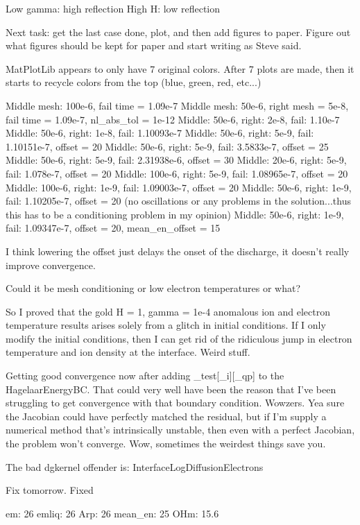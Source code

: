 {Low gamma: high reflection
High H: low reflection

Next task: get the last case done, plot, and then add figures to paper. Figure out what figures should be kept for paper and start writing as Steve said.

MatPlotLib appears to only have 7 original colors. After 7 plots are made, then it starts to recycle colors from the top (blue, green, red, etc...)

Middle mesh: 100e-6, fail time = 1.09e-7
Middle mesh: 50e-6, right mesh = 5e-8, fail time = 1.09e-7, nl_abs_tol = 1e-12
Middle: 50e-6, right: 2e-8, fail: 1.10e-7
Middle: 50e-6, right: 1e-8, fail: 1.10093e-7
Middle: 50e-6, right: 5e-9, fail: 1.10151e-7, offset = 20
Middle: 50e-6, right: 5e-9, fail: 3.5833e-7, offset = 25
Middle: 50e-6, right: 5e-9, fail: 2.31938e-6, offset = 30
Middle: 20e-6, right: 5e-9, fail: 1.078e-7, offset = 20
Middle: 100e-6, right: 5e-9, fail: 1.08965e-7, offset = 20
Middle: 100e-6, right: 1e-9, fail: 1.09003e-7, offset = 20
Middle: 50e-6, right: 1e-9, fail: 1.10205e-7, offset = 20 (no oscillations or any problems in the solution...thus this has to be a conditioning problem in my opinion)
Middle: 50e-6, right: 1e-9, fail: 1.09347e-7, offset = 20, mean_en_offset = 15

I think lowering the offset just delays the onset of the discharge, it doesn't really improve convergence.

Could it be mesh conditioning or low electron temperatures or what?

So I proved that the gold H = 1, gamma = 1e-4 anomalous ion and electron temperature results arises solely from a glitch in initial conditions. If I only modify the initial conditions, then I can get rid of the ridiculous jump in electron temperature and ion density at the interface. Weird stuff.

Getting good convergence now after adding _test[_i][_qp] to the HagelaarEnergyBC. That could very well have been the reason that I've been struggling to get convergence with that boundary condition. Wowzers. Yea sure the Jacobian could have perfectly matched the residual, but if I'm supply a numerical method that's intrinsically unstable, then even with a perfect Jacobian, the problem won't converge. Wow, sometimes the weirdest things save you.

The bad dgkernel offender is: InterfaceLogDiffusionElectrons

Fix tomorrow. Fixed

em: 26
emliq: 26
Arp: 26
mean_en: 25
OHm: 15.6


}
